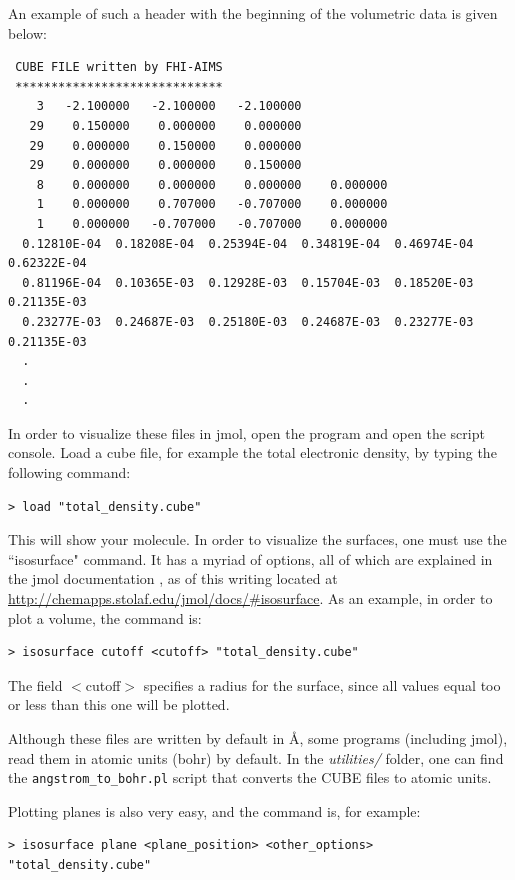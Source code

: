 An example of such a header with the beginning of the volumetric data is given below:

\begin{verbatim}
 CUBE FILE written by FHI-AIMS				
 *****************************
    3   -2.100000   -2.100000   -2.100000
   29    0.150000    0.000000    0.000000
   29    0.000000    0.150000    0.000000
   29    0.000000    0.000000    0.150000
    8    0.000000    0.000000    0.000000    0.000000
    1    0.000000    0.707000   -0.707000    0.000000
    1    0.000000   -0.707000   -0.707000    0.000000
  0.12810E-04  0.18208E-04  0.25394E-04  0.34819E-04  0.46974E-04  0.62322E-04
  0.81196E-04  0.10365E-03  0.12928E-03  0.15704E-03  0.18520E-03  0.21135E-03
  0.23277E-03  0.24687E-03  0.25180E-03  0.24687E-03  0.23277E-03  0.21135E-03
  .
  .
  .
\end{verbatim}

In order to visualize these files in jmol, open the program and open
the script console. Load a cube file, for example the total electronic
density, by typing the following command: 

\begin{verbatim}
> load "total_density.cube"
\end{verbatim}

This will show your molecule. In order to visualize the surfaces, one
must use the ``isosurface" command. It has a myriad of options, all of
which are explained in the jmol documentation \cite{jmol}, as of this
writing located at 
\url{http://chemapps.stolaf.edu/jmol/docs/#isosurface}. As an
example, in order to plot a volume, the command is: 

\begin{verbatim}
> isosurface cutoff <cutoff> "total_density.cube" 
\end{verbatim}

The field $<$cutoff$>$ specifies a radius for the surface, since all values equal too or less than this one will be plotted. 

Although these files are written by default in {\AA}, some programs
(including jmol), read them in atomic units (bohr) by default. In the
\emph{utilities/} folder, one can find the \texttt{angstrom\_to\_bohr.pl}
script that converts the CUBE files to atomic units. 

Plotting planes is also very easy, and the command is, for example:

\begin{verbatim}
> isosurface plane <plane_position> <other_options> "total_density.cube"
\end{verbatim}


